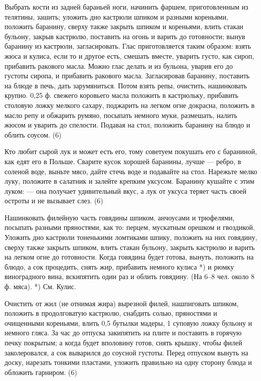 
Выбрать кости из задней бараньей ноги, начинить фаршем, приготовленным из телятины, зашить; уложить дно кастрюли шпиком и разными кореньями, положить баранину, сверху также закрыть шпиком и кореньями, влить стакан бульону, закрыв кастрюлю, поставить на огонь и варить до готовности; вынув баранину из кастрюли, загласировать. Глас приготовляется таким образом: взять жюса и кулиса, если то и другое есть, смешать вместе, уварить густо, как сироп, прибавить ракового масла. Можно глас делать и из бульона, уварив его до густоты сиропа, и прибавить ракового масла. Загласировав баранину, поставить на блюде в печь, дать зарумяниться. Потом взять репы, очистить, нашинковать крупно. 0,25 ф. свежего коровьего масла положить в кастрюльку, прибавить столовую ложку мелкого сахару, поджарить на легком огне докрасна, положить в масло репу и обжарить румяно, посыпать немного муки, размешать, налить жюсом и уварить до спелости. Подавая на стол, положить баранину на блюдо и облить соусом. (6) 


Кто любит сырой лук и может есть его, тому советуем покушать его с бараниной, как едят его в Польше. Сварите кусок хорошей баранины, лучше — ребро, в соленой воде, выньте мясо, дайте стечь воде и подавайте на стол. Нарежьте мелко луку, положите в салатник и залейте крепким уксусом. Баранину кушайте с этим луком: — она получает удивительный вкус, а лук от уксуса теряет часть своей остроты и не вызывает слез. (6) 


Нашинковать филейную часть говядины шпиком, анчоусами и трюфелями, посыпать разными пряностями, как то: перцем, мускатным орешком и гвоздикой. Уложить дно кастрюли тоненькими ломтиками шпику, положить на них говядину, сверху также закрыть шпиком, влить стакан бульону, закрыть кастрюлю и варить на легком огне до готовности. Когда говядина будет готова, вынуть, положить на блюдо, а сок процедить, снять жир, прибавить немного кулиса *) и рюмку виноградного вина, вскипятить один раз и облить говядину. (На 6--8 чел. около 8 ф. мяса). *) См. Кулис. 


Очистить от жил (не отнимая жира) вырезной филей, нашпиговать шпиком, положить в продолговатую кастрюлю, снабдить солью, пряностями и очищенными кореньями, влить 0,5 бутылки мадеры, 1 суповую ложку бульону и немного гляса. За час до отпуска закипятить на плите и поставить в горячую печку покрытым; а когда будет вполовину готов, снять крышку, чтобы филей заколеровался, а сок выварился до соусной густоты. Перед отпуском вынуть на доску, нарезать тонкими пластами, уложить правильно на одну сторону блюда и обложить гарниром. (6) 

